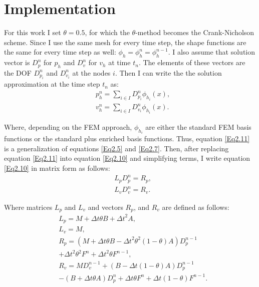 \section{ Implementation}
For this work I  set $\theta =0.5$, for which the $ \theta$-method becomes the Crank-Nicholson scheme. Since I use the same mesh for every time step, the shape functions are the same for every time step as well: $\phi_h = \phi_h^n =\phi_h^{n-1} $. 
I also assume that solution vector is $D_p^n$  for $p_h$ and $D_v^n$ for $v_h$ at time $t_n$. The elements of these vectors are the DOF $D_{p_i}^n$  and $D_{v_i}^n$ at the nodes $i$. Then I can write the the solution approximation at the time step $t_n$ as:
 \begin{equation} \label{Eq2.11}
 \begin{split}
   & p_h^n=\sum_{i \in I}  D_{p_i}^n \phi_{h_i}(x),\\
   & v_h^n=\sum_{i \in I} D_{v_i}^n \phi_{h_i}(x).
 \end{split}
 \end{equation}
 
 Where, depending on the FEM approach, $\phi_{h_i}$ are either the standard FEM basis functions or the standard plus enriched basis functions. Thus, equation \ref{Eq2.11} is a generalization of equations \ref{Eq2.5} and \ref{Eq2.7}. Then, after replacing equation \ref{Eq2.11} into equation \ref{Eq2.10} and simplifying terms, I write equation \ref{Eq2.10} in matrix form as follows:
  \begin{equation} \label{Eq2.12}
 \begin{split}
   & L_p D_p^n = R_p, \\
   &L_v D_v^n = R_v.
 \end{split}
 \end{equation}
 
 Where matrices $L_p$ and  $L_v$ and vectors  $R_p$, and  $R_v$ are defined as follows:
 \begin{equation} \label{Eq2.13}
 \begin{split}
   &L_p = M + \Delta t \theta B +{\Delta t}^2 A, \\
   & L_v=M,\\
   &R_p= \left( M + \Delta t \theta B -{\Delta t}^2  \theta^2(1-\theta) A \right) D_p^{n-1}\\
   &+{\Delta t}^2  \theta^2 F^n + {\Delta t}^2 \theta F^{n-1},\\
   & R_v=M D_v^{n-1} + \left( B -  \Delta t (1-\theta) A \right) D_p^{n-1} \\
   & -\left(  B + \Delta t \theta A \right) D_p^n +\Delta t \theta F^n + \Delta t( 1- \theta) F^{n-1}.
 \end{split}
 \end{equation}
 
